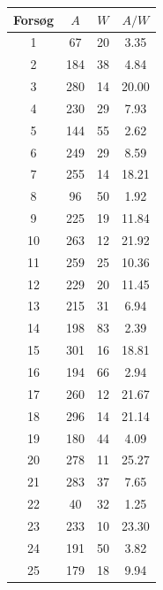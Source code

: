 \begin{minipage}[t]{.5\textwidth}
\centering
\vspace{0pt}
    \begin{tabular}{ c c c c }
        Forsøg & $A$ & $W$ & $A/W$ \\\hline\hline
        1  & 67  & 20 & 3.35  \\
        2  & 184 & 38 & 4.84  \\
        3  & 280 & 14 & 20.00 \\
        4  & 230 & 29 & 7.93  \\
        5  & 144 & 55 & 2.62  \\
        6  & 249 & 29 & 8.59  \\
        7  & 255 & 14 & 18.21 \\
        8  & 96  & 50 & 1.92  \\
        9  & 225 & 19 & 11.84 \\
        10 & 263 & 12 & 21.92 \\
        11 & 259 & 25 & 10.36 \\
        12 & 229 & 20 & 11.45 \\
        13 & 215 & 31 & 6.94  \\
        14 & 198 & 83 & 2.39  \\
        15 & 301 & 16 & 18.81 \\
        16 & 194 & 66 & 2.94  \\
        17 & 260 & 12 & 21.67 \\
        18 & 296 & 14 & 21.14 \\
        19 & 180 & 44 & 4.09  \\
        20 & 278 & 11 & 25.27 \\
        21 & 283 & 37 & 7.65  \\
        22 & 40  & 32 & 1.25  \\
        23 & 233 & 10 & 23.30 \\
        24 & 191 & 50 & 3.82  \\
        25 & 179 & 18 & 9.94  \\\hline
    \end{tabular}
    \label{tab:pegeopgave}
\end{minipage}



